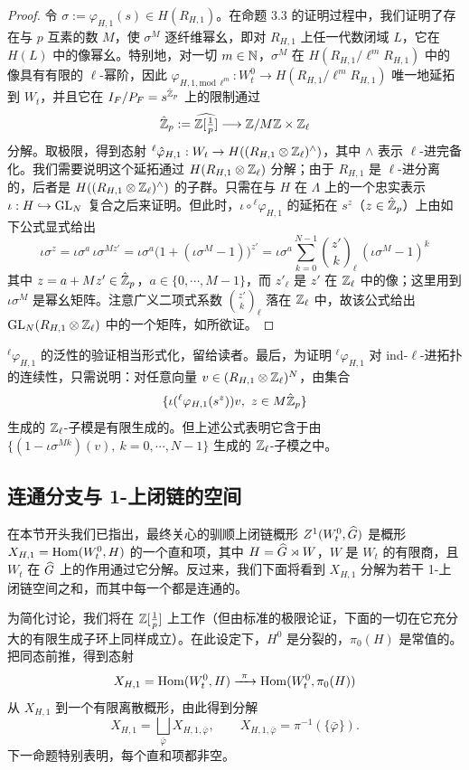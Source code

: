 \begin{proof}
令 $\sigma := \varphi_{H,1}(s)\in H(R_{H,1})$。在命题 3.3 的证明过程中，我们证明了存在与 $p$ 互素的数 $M$，使 $\sigma^M$ 逐纤维幂幺，即对 $R_{H,1}$ 上任一代数闭域 $L$，它在 $H(L)$ 中的像幂幺。特别地，对一切 $m\in\mathbb{N}$，$\sigma^M$ 在 $H(R_{H,1}/\ell^mR_{H,1})$ 中的像具有有限的 $\ell$-幂阶，因此 $\varphi_{H,1,\mathrm{mod}\,\ell^m}:W^0_t\to H(R_{H,1}/\ell^mR_{H,1})$ 唯一地延拓到 $W_t$，并且它在 $I_F/P_F = s^{\hat{\mathbb{Z}}_p}$ 上的限制通过
\[
\hat{\mathbb{Z}}_p := \widehat{\mathbb{Z}[\tfrac1p]}\longrightarrow \mathbb{Z}/M\mathbb{Z}\times\mathbb{Z}_\ell
\]
分解。取极限，得到态射 ${}^\ell\hat\varphi_{H,1}:W_t\to H((R_{H,1}\otimes\mathbb{Z}_\ell)^\wedge)$，其中 $\wedge$ 表示 $\ell$-进完备化。我们需要说明这个延拓通过 $H(R_{H,1}\otimes\mathbb{Z}_\ell)$ 分解；由于 $R_{H,1}$ 是 $\ell$-进分离的，后者是 $H((R_{H,1}\otimes\mathbb{Z}_\ell)^\wedge)$ 的子群。只需在与 $H$ 在 $\Lambda$ 上的一个忠实表示 $\iota:H\hookrightarrow \mathrm{GL}_N$ 复合之后来证明。但此时，$\iota\circ{}^\ell\hat\varphi_{H,1}$ 的延拓在 $s^z$（$z\in\hat{\mathbb{Z}}_p$）上由如下公式显式给出
\[
\iota\sigma^z = \iota\sigma^a\,\iota\sigma^{Mz'} = \iota\sigma^a\bigl(1+(\iota\sigma^M-1)\bigr)^{z'} = \iota\sigma^a\sum_{k=0}^{N-1}\binom{z'}{k}_{\!\ell}\,(\iota\sigma^M-1)^k
\]
其中 $z = a+Mz'\in\hat{\mathbb{Z}}_p$，$a\in\{0,\cdots,M-1\}$，而 $z'_\ell$ 是 $z'$ 在 $\mathbb{Z}_\ell$ 中的像；这里用到 $\iota\sigma^M$ 是幂幺矩阵。注意广义二项式系数 $\binom{z'}{k}_{\ell}$ 落在 $\mathbb{Z}_\ell$ 中，故该公式给出 $\mathrm{GL}_N(R_{H,1}\otimes\mathbb{Z}_\ell)$ 中的一个矩阵，如所欲证。
\end{proof}
${}^\ell\varphi_{H,1}$ 的泛性的验证相当形式化，留给读者。最后，为证明 ${}^\ell\varphi_{H,1}$ 对 ind-$\ell$-进拓扑的连续性，只需说明：对任意向量 $v\in(R_{H,1}\otimes\mathbb{Z}_\ell)^N$，由集合
\[
\{\iota({}^\ell\varphi_{H,1}(s^z))v,\ z\in M\hat{\mathbb{Z}}_p\}
\]
生成的 $\mathbb{Z}_\ell$-子模是有限生成的。但上述公式表明它含于由 $\{(1-\iota\sigma^{Mk})(v),\ k=0,\cdots,N-1\}$ 生成的 $\mathbb{Z}_\ell$-子模之中。

\subsection{连通分支与 1-上闭链的空间}

在本节开头我们已指出，最终关心的驯顺上闭链概形 $Z^1(W^0_t,\widehat{G})$ 是概形 $X_{H,1}=\operatorname{Hom}(W^0_t,H)$ 的一个直和项，其中 $H=\widehat{G}\rtimes W$，$W$ 是 $W_t$ 的有限商，且 $W_t$ 在 $\widehat{G}$ 上的作用通过它分解。反过来，我们下面将看到 $X_{H,1}$ 分解为若干 1-上闭链空间之和，而其中每一个都是连通的。

为简化讨论，我们将在 $\mathbb{Z}[\frac1p]$ 上工作（但由标准的极限论证，下面的一切在它充分大的有限生成子环上同样成立）。在此设定下，$H^0$ 是分裂的，$\pi_0(H)$ 是常值的。把同态前推，得到态射
\[
X_{H,1}=\Hom(W^0_t,H)\xrightarrow{\ \pi\ }\Hom(W^0_t,\pi_0(H))
\]
从 $X_{H,1}$ 到一个有限离散概形，由此得到分解
\[
X_{H,1}=\bigsqcup_{\bar\varphi}X_{H,1,\bar\varphi},\qquad X_{H,1,\bar\varphi}=\pi^{-1}(\{\bar\varphi\}).
\]
下一命题特别表明，每个直和项都非空。


